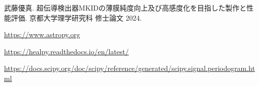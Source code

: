 \begin{thebibliography}{99}
武藤優真. 超伝導検出器MKIDの薄膜純度向上及び高感度化を目指した製作と性能評価. 京都大学理学研究科 修士論文 2024.

\href{https://www.astropy.org}{https://www.astropy.org}

\href{https://healpy.readthedocs.io/en/latest/}{https://healpy.readthedocs.io/en/latest/}

\href{https://docs.scipy.org/doc/scipy/reference/generated/scipy.signal.periodogram.html}{https://docs.scipy.org/doc/scipy/reference/generated/scipy.signal.periodogram.html}


\end{thebibliography}
